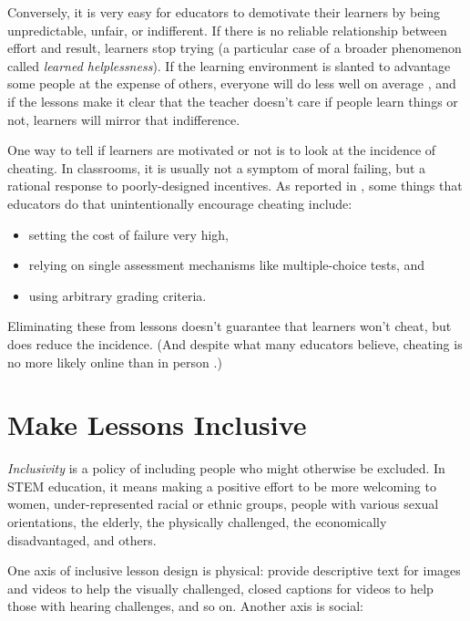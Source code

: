 \documentclass[10pt,letterpaper]{article}
\newcommand{\rulemajor}[1]{\section{#1}}
\begin{document}
Conversely, it is very easy for educators to demotivate their learners by being
unpredictable, unfair, or indifferent.  If there is no reliable relationship
between effort and result, learners stop trying (a particular case of a broader
phenomenon called \emph{learned helplessness}).  If the learning environment is
slanted to advantage some people at the expense of others, everyone will do less
well on average \cite{Wilk2011}, and if the lessons make it clear that the
teacher doesn't care if people learn things or not, learners will mirror that
indifference.

One way to tell if learners are motivated or not is to look at the incidence of
cheating.  In classrooms, it is usually not a symptom of moral failing, but a
rational response to poorly-designed incentives.  As reported in
\cite{Lang2013}, some things that educators do that unintentionally encourage
cheating include:

\begin{itemize}

\item setting the cost of failure very high,

\item relying on single assessment mechanisms like multiple-choice tests, and

\item using arbitrary grading criteria.

\end{itemize}

Eliminating these from lessons doesn't guarantee that learners won't cheat, but
does reduce the incidence.  (And despite what many educators believe, cheating
is no more likely online than in person \cite{Beck2014}.)

\rulemajor{Make Lessons Inclusive}

\emph{Inclusivity} is a policy of including people who might otherwise be
excluded.  In STEM education, it means making a positive effort to be more
welcoming to women, under-represented racial or ethnic groups, people with
various sexual orientations, the elderly, the physically challenged, the
economically disadvantaged, and others.

One axis of inclusive lesson design is physical: provide descriptive text for
images and videos to help the visually challenged, closed captions for videos to
help those with hearing challenges, and so on.  Another axis is social:
\end{document}
